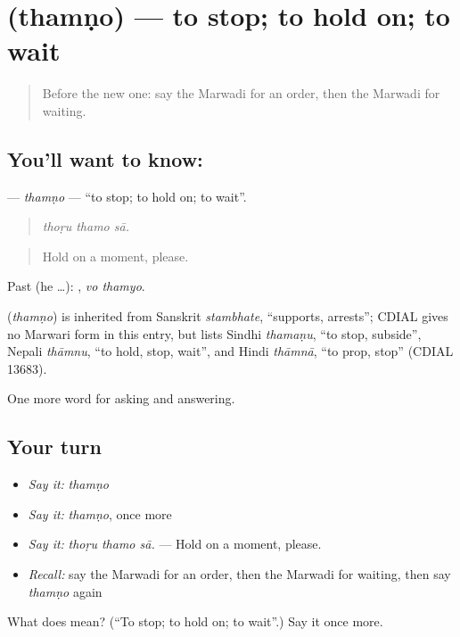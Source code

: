 \section[\texorpdfstring{\mw{थमणो} (thamṇo)}{थमणो (thamṇo)}]{ (thamṇo) — to stop; to hold on; to wait}

\label{lesson:MW-C267-thamno}



\begin{quote}
Before the new one: say the Marwadi for an order, then the Marwadi for waiting.
\end{quote}

\subsection*{You'll want to know: }
\textbf{} — \emph{thamṇo} — \textquotedblleft{}to stop; to hold on; to wait\textquotedblright{}.

\begin{quote}
  
\end{quote}

\begin{quote}
\emph{thoṛu thamo sā.}
\end{quote}

\begin{quote}
Hold on a moment, please.
\end{quote}

Past (he …):  , \emph{vo thamyo}.

\begin{cousinweb}
\textbf{} (\emph{thamṇo}) is inherited from Sanskrit \emph{stambhate}, \textquotedblleft{}supports, arrests\textquotedblright{}; CDIAL gives no Marwari form in this entry, but lists Sindhi \emph{thamaṇu}, \textquotedblleft{}to stop, subside\textquotedblright{}, Nepali \emph{thāmnu}, \textquotedblleft{}to hold, stop, wait\textquotedblright{}, and Hindi \emph{thāmnā}, \textquotedblleft{}to prop, stop\textquotedblright{} (CDIAL 13683).
\end{cousinweb}

\begin{grammarlens}[title={What you've built}]
One more word for asking and answering.
\end{grammarlens}

\subsection*{Your turn}
\begin{itemize}
\raggedright
  \item \emph{Say it:} \emph{thamṇo}
  \item \emph{Say it:} \emph{thamṇo}, once more
  \item \emph{Say it:} \emph{thoṛu thamo sā.} — Hold on a moment, please.
  \item \emph{Recall:} say the Marwadi for an order, then the Marwadi for waiting, then say \emph{thamṇo} again
\end{itemize}

\begin{tcolorbox}[breakable,colback=teal!4,colframe=teal!35!black,title={Before you move on}]
What does  mean? (\textquotedblleft{}To stop; to hold on; to wait\textquotedblright{}.) Say it once more.
\end{tcolorbox}
